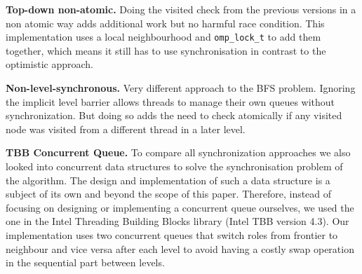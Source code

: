 \documentclass[letterpaper]{article}
\newcommand{\mypar}[1]{{\bf #1.}} %
\begin{document}
		\mypar{Top-down non-atomic}
		Doing the visited check from the previous versions in a non atomic way adds additional work but no harmful race condition.
		This implementation uses a local neighbourhood and \verb+omp_lock_t+ to add them together, which means it still has to use synchronisation in contrast to the optimistic approach.

		\mypar{Non-level-synchronous}
		Very different approach to the BFS problem. Ignoring the implicit level barrier allows threads to manage their own queues without synchronization. But doing so adds the need to check atomically if any visited node was visited from a different thread in a later level.


		\mypar{TBB Concurrent Queue}
		To compare all synchronization approaches we also looked into concurrent data structures to solve the synchronisation problem of the algorithm.
		The design and implementation of such a data structure is a subject of its own and beyond the scope of this paper. Therefore, instead of focusing on designing or implementing a concurrent queue ourselves, we used the one in the Intel Threading Building Blocks library (Intel TBB version 4.3).
		Our implementation uses two concurrent queues that switch roles from frontier to neighbour and vice versa after each level to avoid having a costly swap operation in the sequential part between levels.
\end{document}
